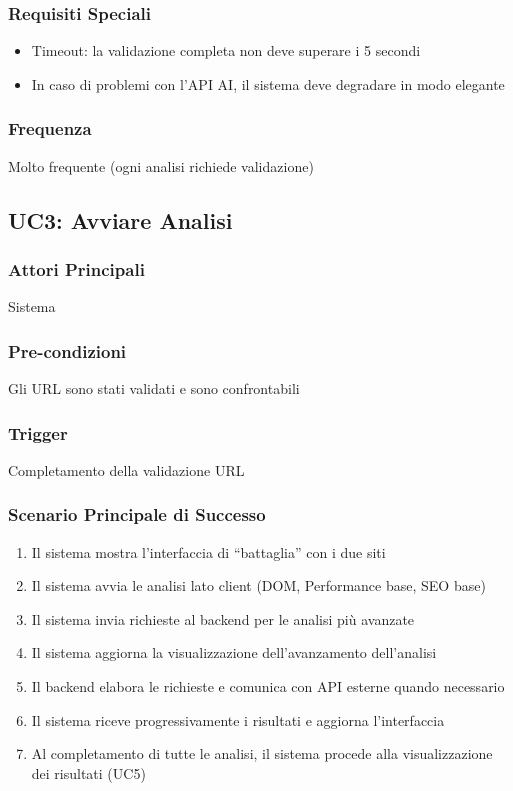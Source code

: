 \subsubsection{Requisiti Speciali}
\begin{itemize}
    \item Timeout: la validazione completa non deve superare i 5 secondi
    \item In caso di problemi con l'API AI, il sistema deve degradare in modo elegante
\end{itemize}

\subsubsection{Frequenza}
Molto frequente (ogni analisi richiede validazione)

\subsection{UC3: Avviare Analisi}

\subsubsection{Attori Principali}
Sistema

\subsubsection{Pre-condizioni}
Gli URL sono stati validati e sono confrontabili

\subsubsection{Trigger}
Completamento della validazione URL

\subsubsection{Scenario Principale di Successo}
\begin{enumerate}
    \item Il sistema mostra l'interfaccia di ``battaglia'' con i due siti
    \item Il sistema avvia le analisi lato client (DOM, Performance base, SEO base)
    \item Il sistema invia richieste al backend per le analisi più avanzate
    \item Il sistema aggiorna la visualizzazione dell'avanzamento dell'analisi
    \item Il backend elabora le richieste e comunica con API esterne quando necessario
    \item Il sistema riceve progressivamente i risultati e aggiorna l'interfaccia
    \item Al completamento di tutte le analisi, il sistema procede alla visualizzazione dei risultati (UC5)
\end{enumerate}

